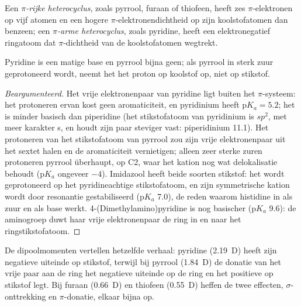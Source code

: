 \begin{definition}\label{def:b3:heterocycles:pi-character}
Een \emph{$\pi$-rijke heterocyclus}, zoals
pyrrool, furaan of thiofeen, heeft zes $\pi$-elektronen op vijf atomen en een hogere
$\pi$-elektronendichtheid op zijn koolstofatomen dan benzeen; een
\emph{$\pi$-arme heterocyclus}, zoals
pyridine, heeft een elektronegatief ringatoom dat $\pi$-dichtheid van de koolstofatomen wegtrekt.
\end{definition}

\begin{proposition}[Basiciteit]\label{prop:b3:heterocycles:basicity}
Pyridine is een matige base en pyrrool bijna geen; als pyrrool in sterk
zuur geprotoneerd wordt, neemt het het proton op koolstof op, niet op
stikstof.
\end{proposition}

\begin{proof}[Beargumenteerd]
Het vrije elektronenpaar van pyridine ligt buiten het $\pi$-systeem: het
protoneren ervan kost geen aromaticiteit, en pyridinium heeft $\mathrm pK_a = 5.2$; het is minder basisch dan piperidine
(het stikstofatoom van pyridinium is $sp^2$, met meer karakter s, en houdt zijn paar
steviger vast: piperidinium 11.1). Het protoneren van het stikstofatoom
van pyrrool zou zijn vrije elektronenpaar uit het sextet halen en de
aromaticiteit vernietigen; alleen zeer sterke zuren protoneren pyrrool
überhaupt, op C2, waar het kation nog wat delokalisatie behoudt
($\mathrm pK_a$ ongeveer $-4$). Imidazool heeft beide soorten stikstof: het wordt geprotoneerd op het
pyridineachtige stikstofatoom, en zijn symmetrische kation wordt door
resonantie gestabiliseerd ($\mathrm pK_a$
7.0), de reden waarom histidine in  als zuur en als base werkt.
4-(Dimethylamino)pyridine is nog basischer ($\mathrm pK_a$ 9.6): de aminogroep duwt
haar vrije elektronenpaar de ring in en naar het ringstikstofatoom.
\end{proof}

De dipoolmomenten vertellen hetzelfde verhaal: pyridine (\qty{2.19}{D}) heeft zijn negatieve uiteinde
op stikstof, terwijl bij pyrrool (\qty{1.84}{D}) de donatie van het vrije paar aan de
ring het negatieve uiteinde op de ring en het positieve op stikstof legt.
Bij furaan
(\qty{0.66}{D}) en thiofeen (\qty{0.55}{D}) heffen de twee effecten, $\sigma$-onttrekking en $\pi$-donatie, elkaar
bijna op.

